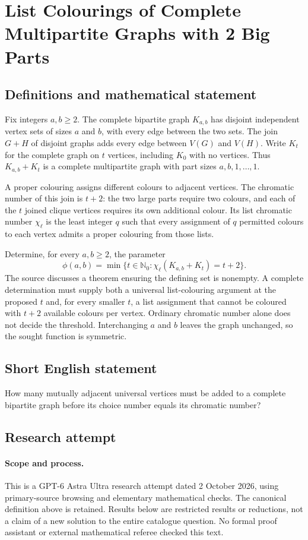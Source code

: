 \documentclass[11pt,a4paper]{article}
\begin{document}
\section*{List Colourings of Complete Multipartite Graphs with 2 Big Parts}\label{statement}

\subsection{Definitions and mathematical statement}
Fix integers $a,b\ge2$. The complete bipartite graph $K_{a,b}$ has disjoint
independent vertex sets of sizes $a$ and $b$, with every edge between the
two sets. The join $G+H$ of disjoint graphs adds every edge between
$V(G)$ and $V(H)$. Write $K_t$ for the complete graph on $t$ vertices,
including $K_0$ with no vertices. Thus $K_{a,b}+K_t$ is a complete
multipartite graph with part sizes $a,b,1,\ldots,1$.

A proper colouring assigns different colours to adjacent vertices.
The chromatic number of this join is $t+2$: the two large parts require
two colours, and each of the $t$ joined clique vertices requires its own
additional colour. Its list chromatic number $\chi_\ell$ is the least
integer $q$ such that every assignment of $q$ permitted colours to each
vertex admits a proper colouring from those lists.

Determine, for every $a,b\ge2$, the parameter
\[
 \phi(a,b)=\min\{t\in\mathbb N_0:
                 \chi_\ell(K_{a,b}+K_t)=t+2\}.
\]
The source discusses a theorem ensuring the defining set is nonempty.
A complete determination must supply both a universal list-colouring
argument at the proposed $t$ and, for every smaller $t$, a list assignment
that cannot be coloured with $t+2$ available colours per vertex. Ordinary
chromatic number alone does not decide the threshold. Interchanging $a$
and $b$ leaves the graph unchanged, so the sought function is symmetric.
\subsection{Short English statement}
How many mutually adjacent universal vertices must be added to a complete bipartite graph before its choice number equals its chromatic number?
\subsection{Research attempt}
\paragraph{Scope and process.}
This is a GPT-6 Astra Ultra research attempt dated 2 October 2026, using
primary-source browsing and elementary mathematical checks. The canonical
definition above is retained. Results below are restricted results or
reductions, not a claim of a new solution to the entire catalogue question.
No formal proof assistant or external mathematical referee checked this text.
\end{document}
